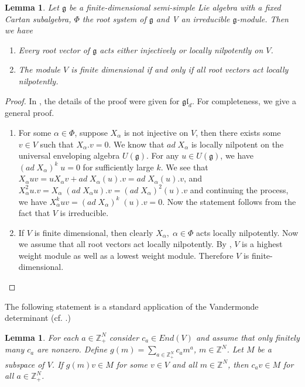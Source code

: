 \documentclass[a4paper,11pt]{amsart}
\numberwithin{equation}{section}
\theoremstyle{plain}
\newtheorem{lemma}[theorem]{Lemma}
\newcommand{\Z}{\mathbb{Z}}
\newcommand{\g}{\mathfrak{g}}
\newcommand{\gl}{\mathfrak{gl}}
\begin{document}
\begin{lemma}\label{fd}
Let $\g$ be a finite-dimensional semi-simple Lie algebra with a fixed Cartan subalgebra, $\Phi$ the root system of $\g$ and  V an irreducible $\g$-module. Then we have 
\begin{enumerate}
    \item Every root vector of $\g$ acts either injectively or locally nilpotently on $V$.
    \item The module $V$ is finite dimensional if and only if all root vectors act locally nilpotently.
\end{enumerate}
\end{lemma}
\begin{proof}
    In \cite[Lemma 2.4]{LZ15}, the details of the proof were given for $\gl_d$. For completeness, we give a general proof. 
    \begin{enumerate}
        \item For some $\alpha \in \Phi$, suppose $X_{\alpha}$ is not injective on $V$, then there exists some $v\in V$ such that $X_{\alpha}.v=0$. We know that $ad\; X_{\alpha}$ is locally nilpotent on the universal enveloping algebra $U(\g)$. For any $u\in U(\g)$, we have $(ad\; X_{\alpha})^k \;u=0$ for sufficiently  large $k$. 
        We see that $X_{\alpha}uv=uX_{\alpha}v+ad\; X_{\alpha}(u).v=ad\; X_{\alpha}(u).v$, and $X_{\alpha}^2u.v=X_{\alpha}\; (ad \; X_{\alpha} u).v=(ad\; X_{\alpha})^2(u).v$ and continuing the process, we have $X_{\alpha}^k uv=(ad\;X_{\alpha})^k \;(u).v=0$. Now the statement follows from the fact that $V$ is irreducible.
        \item  If $V$ is finite dimensional, then clearly $X_\alpha,\; \alpha\in \Phi$ acts locally nilpotently. Now we assume that all root vectors act locally nilpotently. By  \cite[Theorem 1.1]{MZ13}, $V$ is a highest weight module as well as a lowest weight module. Therefore  $V$ is finite-dimensional.    \end{enumerate}
\end{proof}

The following statement is a standard application of the Vandermonde determinant (cf. \cite[Lemma 2.3]{LZ15}.)

\begin{lemma}\label{la}
   For each $a\in \Z_+^N$ consider $c_a\in End(V)$ and assume that only finitely many $c_a$ are nonzero. Define $g(m)=\sum_{a\in \Z_+^N}c_am^a$,  $m\in \Z^N$. Let $M$ be a subspace of $V$.  If $g(m)v\in M$ for some $v\in V$ and all $m\in \Z^N$, then $c_av\in M$ for all $a\in \Z_+^N$. 
\end{lemma}
\end{document}
